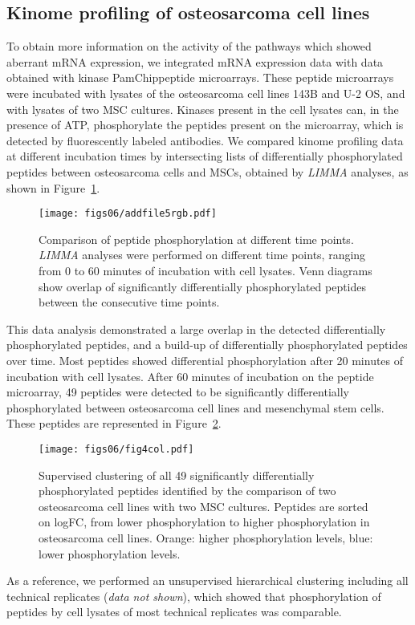 \subsection{Kinome profiling of osteosarcoma cell lines}
To obtain more information on the activity of the pathways which showed aberrant mRNA expression, we integrated mRNA expression data with data obtained with kinase PamChip\textregistered peptide microarrays. These peptide microarrays were incubated with lysates of the osteosarcoma cell lines 143B and U-2 OS, and with lysates of two MSC cultures. Kinases present in the cell lysates can, in the presence of ATP, phosphorylate the peptides present on the microarray, which is detected by fluorescently labeled antibodies. We compared kinome profiling data at different incubation times by intersecting lists of differentially phosphorylated peptides between osteosarcoma cells and MSCs, obtained by {\it LIMMA} analyses, as shown in Figure~\ref{afig6.5}.
%
\begin{figure}[htbp]
  \centering
  \begin{minipage}[b]{0.50\linewidth}
   \texttt{[image: figs06/addfile5rgb.pdf]}		%
  \end{minipage}
    \hfill
  \begin{minipage}[b]{0.46\linewidth}
     \caption{Comparison of peptide phosphorylation at different time points. {\it LIMMA} analyses were performed on different time points, ranging from 0 to 60 minutes of incubation with cell lysates. Venn diagrams show overlap of significantly differentially phosphorylated peptides between the consecutive time points.}
     \label{afig6.5}
     \end{minipage}
\end{figure}
%
This data analysis demonstrated a large overlap in the detected differentially phosphorylated peptides, and a build-up of differentially phosphorylated peptides over time. Most peptides showed differential phosphorylation after 20 minutes of incubation with cell lysates. After 60 minutes of incubation on the peptide microarray, 49 peptides were detected to be significantly differentially phosphorylated between osteosarcoma cell lines and mesenchymal stem cells. These peptides are represented in Figure~\ref{fig6.4}.
%
\begin{figure}[htbp]
	\centering
	\texttt{[image: figs06/fig4col.pdf]}	%
	\caption{Supervised clustering of all 49 significantly differentially phosphorylated peptides identified by the comparison of two osteosarcoma cell lines with two MSC cultures. Peptides are sorted on logFC, from lower phosphorylation to higher phosphorylation in osteosarcoma cell lines. Orange: higher phosphorylation levels, blue: lower phosphorylation levels.}
	\label{fig6.4}
\end{figure}
%
As a reference, we performed an unsupervised hierarchical clustering including all technical replicates ({\it data not shown}), which showed that phosphorylation of peptides by cell lysates of most technical replicates was comparable.

